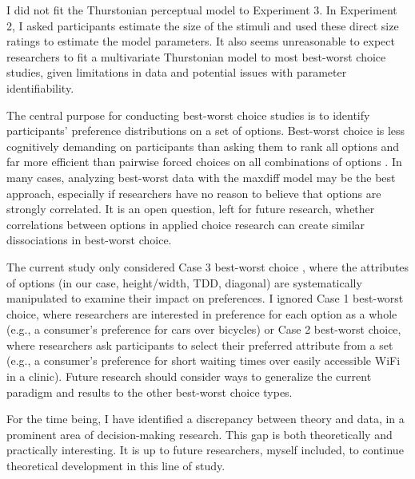 
I did not fit the Thurstonian perceptual model to Experiment 3. In Experiment 2, I asked participants estimate the size of the stimuli and used these direct size ratings to estimate the model parameters. It also seems unreasonable to expect researchers to fit a multivariate Thurstonian model to most best-worst choice studies, given limitations in data and potential issues with parameter identifiability. 

The central purpose for conducting best-worst choice studies is to identify participants' preference distributions on a set of options. Best-worst choice is less cognitively demanding on participants than asking them to rank all options and far more efficient than pairwise forced choices on all combinations of options \parencite{louviere2008modeling}. In many cases, analyzing best-worst data with the maxdiff model may be the best approach, especially if researchers have no reason to believe that options are strongly correlated. It is an open question, left for future research, whether correlations between options in applied choice research can create similar dissociations in best-worst choice. 

The current study only considered Case 3 best-worst choice \parencite{marleyModelsBestWorst2012}, where the attributes of options (in our case, height/width, TDD, diagonal) are systematically manipulated to examine their impact on preferences. I ignored Case 1 best-worst choice, where researchers are interested in preference for each option as a whole (e.g., a consumer's preference for cars over bicycles) or Case 2 best-worst choice, where researchers ask participants to select their preferred attribute from a set (e.g., a consumer's preference for short waiting times over easily accessible WiFi in a clinic). Future research should consider ways to generalize the current paradigm and results to the other best-worst choice types.

For the time being, I have identified a discrepancy between theory and data, in a prominent area of decision-making research. This gap is both theoretically and practically interesting. It is up to future researchers, myself included, to continue theoretical development in this line of study. 